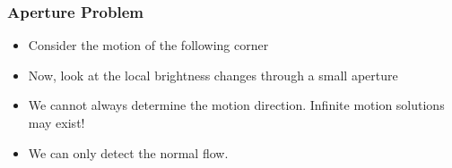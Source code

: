 \begin{frame}
  \frametitle{Aperture Problem}

  \begin{itemize}
    \item<1-2> Consider the motion of the following corner
    \item<3-> Now, look at the local brightness changes through a small aperture
    \item<5-> We cannot always determine the motion direction. Infinite motion solutions may exist!
    \item<6-> We can only detect the normal flow.
  \end{itemize}

  \begin{center}





\end{center}
\end{frame}
